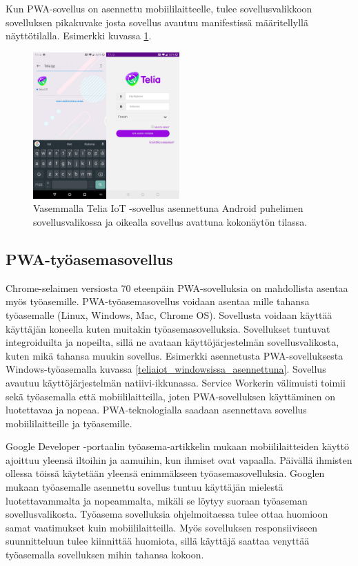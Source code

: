 \documentclass{tktltiki}
\begin{document}
Kun PWA-sovellus on asennettu mobiililaitteelle, tulee sovellusvalikkoon sovelluksen pikakuvake josta sovellus avautuu manifestissä määritellyllä näyttötilalla. Esimerkki kuvassa \ref{teliaiot_puhelimessa_asennettuna}.

\begin{figure}[!htbp]
  \centering
    \includegraphics[width=0.5\textwidth]{teliaiot_puhelimessa.jpg}
      \caption{Vasemmalla Telia IoT -sovellus asennettuna Android puhelimen sovellusvalikossa ja oikealla sovellus avattuna kokonäytön tilassa.}
      \label{teliaiot_puhelimessa_asennettuna}
\end{figure}

\clearpage

\subsection{PWA-työasemasovellus} 

Chrome-selaimen versiosta 70 eteenpäin PWA-sovelluksia on mahdollista asentaa myös työasemille. PWA-työasemasovellus voidaan asentaa mille tahansa työasemalle (Linux, Windows, Mac, Chrome OS). Sovellusta voidaan käyttää käyttäjän koneella kuten muitakin työasemasovelluksia. Sovellukset tuntuvat integroiduilta ja nopeilta, sillä ne avataan käyttöjärjestelmän sovellusvalikosta, kuten mikä tahansa muukin sovellus. Esimerkki asennetusta PWA-sovelluksesta Windows-työasemalla kuvassa \ref{teliaiot_windowsissa_asennettuna}. Sovellus avautuu käyttöjärjestelmän natiivi-ikkunassa. Service Workerin välimuisti toimii sekä työasemalla että mobiililaitteilla, joten PWA-sovelluksen käyttäminen on luotettavaa ja nopeaa. PWA-teknologialla saadaan asennettava sovellus mobiililaitteille ja työasemille.

Google Developer -portaalin työasema-artikkelin mukaan \cite{Google} mobiililaitteiden käyttö ajoittuu yleensä iltoihin ja aamuihin, kun ihmiset ovat vapaalla. Päivällä ihmisten ollessa töissä käytetään yleensä enimmäkseen työasemasovelluksia. Googlen mukaan työasemalle asennettu sovellus tuntuu käyttäjän mielestä luotettavammalta ja nopeammalta, mikäli se löytyy suoraan työaseman sovellusvalikosta. Työasema sovelluksia ohjelmoitaessa tulee ottaa huomioon samat vaatimukset kuin mobiililaitteilla. Myös sovelluksen responsiiviseen suunnitteluun tulee kiinnittää huomiota, sillä käyttäjä saattaa venyttää työasemalla sovelluksen mihin tahansa kokoon.
\end{document}
